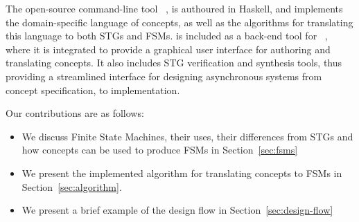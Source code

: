 The open-source command-line tool ~\cite{2017_plato_github}, is authoured in Haskell, and implements the domain-specific language of concepts, 
as well as the algorithms for translating this language to both STGs and FSMs.  is included as a
back-end tool for ~\cite{Sokolov-2016-book-Workcraft}\cite{Workcraft_website}, where it is integrated to provide
a graphical user interface for authoring and translating concepts. It also includes STG verification and synthesis tools, thus providing
a streamlined interface for designing asynchronous systems from concept specification, to implementation. 

Our contributions are as follows:
\begin{itemize}

\item We discuss Finite State Machines, their uses, their differences from STGs and how concepts can be used to produce FSMs in Section~\ref{sec:fsms}

\item We present the implemented algorithm for translating
concepts to FSMs in Section~\ref{sec:algorithm}.

\item We present a brief example of the design flow in Section~\ref{sec:design-flow}

\end{itemize}